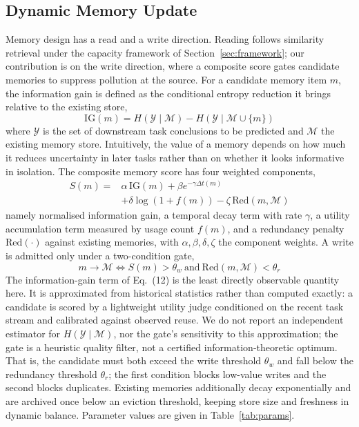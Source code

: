 \documentclass[journal,10pt,a4paper]{IEEEtran}
\begin{document}
\subsection{Dynamic Memory Update}
\label{sec:memory}
Memory design has a read and a write direction. Reading follows similarity retrieval under the capacity framework of Section~\ref{sec:framework}; our contribution is on the write direction, where a composite score gates candidate memories to suppress pollution at the source. For a candidate memory item $m$, the information gain is defined as the conditional entropy reduction it brings relative to the existing store,
\begin{equation}
\mathrm{IG}(m)=H(\mathcal{Y}\mid\mathcal{M})-H(\mathcal{Y}\mid\mathcal{M}\cup\{m\})
\end{equation}
where $\mathcal{Y}$ is the set of downstream task conclusions to be predicted and $\mathcal{M}$ the existing memory store. Intuitively, the value of a memory depends on how much it reduces uncertainty in later tasks rather than on whether it looks informative in isolation. The composite memory score has four weighted components,
\begin{equation}
\begin{split}
S(m)={}&\alpha\,\mathrm{IG}(m)+\beta e^{-\gamma\Delta t(m)}\\
&+\delta\log(1+f(m))-\zeta\,\mathrm{Red}(m,\mathcal{M})
\end{split}
\end{equation}
namely normalised information gain, a temporal decay term with rate $\gamma$, a utility accumulation term measured by usage count $f(m)$, and a redundancy penalty $\mathrm{Red}(\cdot)$ against existing memories, with $\alpha,\beta,\delta,\zeta$ the component weights. A write is admitted only under a two-condition gate,
\begin{equation}
m\to\mathcal{M}\iff S(m)>\theta_w\ \text{and}\ \mathrm{Red}(m,\mathcal{M})<\theta_r
\end{equation}
The information-gain term of Eq.~(12) is the least directly observable quantity here. It is approximated from historical statistics rather than computed exactly: a candidate is scored by a lightweight utility judge conditioned on the recent task stream and calibrated against observed reuse. We do not report an independent estimator for $H(\mathcal{Y}\mid\mathcal{M})$, nor the gate's sensitivity to this approximation; the gate is a heuristic quality filter, not a certified information-theoretic optimum. That is, the candidate must both exceed the write threshold $\theta_w$ and fall below the redundancy threshold $\theta_r$; the first condition blocks low-value writes and the second blocks duplicates. Existing memories additionally decay exponentially and are archived once below an eviction threshold, keeping store size and freshness in dynamic balance. Parameter values are given in Table~\ref{tab:params}.
\end{document}
